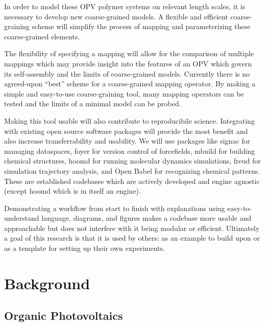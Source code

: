In order to model these OPV polymer systems on relevant length scales, it is necessary to develop new coarse-grained models.
A flexible and efficient coarse-graining scheme will simplify the process of mapping and parameterizing these coarse-grained elements.

The flexibility of specifying a mapping will allow for the comparison of multiple mappings which may provide insight into the features of an OPV which govern its self-assembly and the limits of coarse-grained models.
Currently there is no agreed-upon ``best'' scheme for a coarse-grained mapping operator.
By making a simple and easy-to-use coarse-graining tool, many mapping operators can be tested and the limits of a minimal model can be probed.

Making this tool usable will also contribute to reproducibile science. 
Integrating with existing open source software packages will provide the most benefit and also increase transferrability and usability.
We will use packages like signac for managing dataspaces, foyer for version control of forcefields, mbuild for building chemical structures, hoomd for running molecular dynamics simulations, freud for simulation trajectory analysis, and Open Babel for recognizing chemical patterns\cite{signac, foyer, mbuild, hoomd, freud, openbabel}.
These are established codebases which are actively developed and engine agnostic (except hoomd which is in itself an engine).

Demonstrating a workflow from start to finish with explanations using easy-to-understand language, diagrams, and figures makes a codebase more usable and approachable but does not interfere with it being modular or efficient.
Ultimately a goal of this research is that it is used by others: as an example to build upon or as a template for setting up their own experiments.

\section*{Background}

\subsection*{Organic Photovoltaics}


